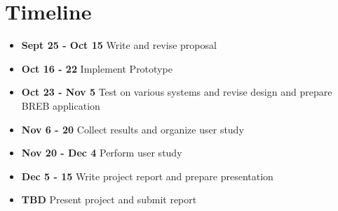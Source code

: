\section{Timeline}
\label{sec:timeline}

\begin{itemize}
    \item \textbf{Sept 25 - Oct 15} Write and revise proposal
    \item \textbf{Oct 16 - 22} Implement Prototype
    \item \textbf{Oct 23 - Nov 5} Test on various systems and revise design and prepare BREB application
    \item \textbf{Nov 6 - 20} Collect results and organize user study
    \item \textbf{Nov 20 - Dec 4} Perform user study
    \item \textbf{Dec 5 - 15} Write project report and prepare presentation
    \item \textbf{TBD} Present project and submit report
\end{itemize}
